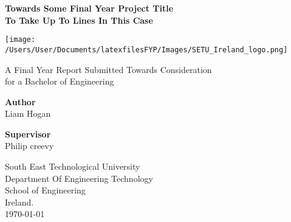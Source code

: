 \thispagestyle{empty}

\begin{center}
	\begin{LARGE}
		\textbf{Towards Some Final Year Project Title} \\
		\textbf{To Take Up To Lines In This Case} \\
	\end{LARGE}

\vspace{40pt}

\begin{center}
	\texttt{[image: /Users/User/Documents/latexfilesFYP/Images/SETU\_Ireland\_logo.png]}
\end{center}

\vspace{50pt}

A Final Year Report Submitted Towards Consideration \\
for a Bachelor of Engineering \\

\vspace{60pt}

\textbf{Author} \\
Liam Hogan \\

\vspace{40pt}

\textbf{Supervisor} \\
Philip creevy \\

\vspace{30pt}

South East Technological University \\
Department Of Engineering Technology \\
School of Engineering \\
Ireland. \\
\today
\end{center}
